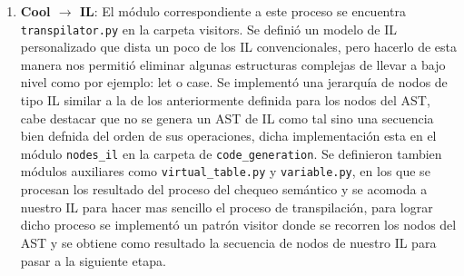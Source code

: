 \documentclass{article}
\begin{document}
\begin{enumerate}
	\item[] \textbf{Cool $\rightarrow$ IL}: El m\'odulo correspondiente a este proceso se encuentra \verb|transpilator.py| en la carpeta visitors. Se defini\'o un modelo de IL personalizado que dista un poco de los IL convencionales, pero hacerlo de esta manera nos permiti\'o eliminar algunas estructuras complejas de llevar a bajo nivel como por ejemplo: let o case. Se implement\'o una jerarqu\'ia de nodos de tipo IL similar a la de los anteriormente definida para los nodos del AST, cabe destacar que no se genera un AST de IL como tal sino una secuencia bien defnida del orden de sus operaciones, dicha implementaci\'on esta en el m\'odulo \verb|nodes_il| en la carpeta de \verb|code_generation|. Se definieron tambien m\'odulos auxiliares como \verb|virtual_table.py| y \verb|variable.py|, en los que se procesan los resultado del proceso del chequeo sem\'antico y se acomoda a nuestro IL para hacer mas sencillo el proceso de transpilaci\'on, para lograr dicho proceso se implement\'o un patr\'on visitor donde se recorren los nodos del AST y se obtiene como resultado la secuencia de nodos de nuestro IL para pasar a la siguiente etapa.
	

\end{enumerate}
\end{document}
